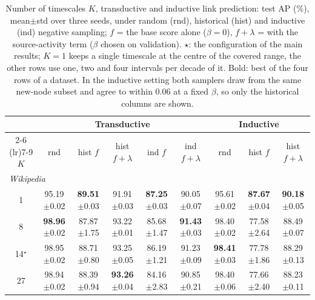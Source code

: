 \begin{table}[p]
\caption{Number of timescales $K$, transductive and inductive link prediction: test AP (\%), mean{\scriptsize$\pm$std} over three seeds, under random (rnd), historical (hist) and inductive (ind) negative sampling; $f$ = the base score alone ($\beta=0$), $f{+}\lambda$ = with the source-activity term ($\beta$ chosen on validation). $\star$: the configuration of the main results; $K=1$ keeps a single timescale at the centre of the covered range, the other rows use one, two and four intervals per decade of it. Bold: best of the four rows of a dataset. In the inductive setting both samplers draw from the same new-node subset and agree to within 0.06 at a fixed $\beta$, so only the historical columns are shown.}
\label{tab:a1_scales_full}
\centering
\footnotesize
\setlength{\tabcolsep}{2.5pt}
\renewcommand{\arraystretch}{0.92}
\begin{tabular}{ccccccccc}
\toprule
 & \multicolumn{5}{c}{Transductive} & \multicolumn{3}{c}{Inductive} \\
\cmidrule(lr){2-6} \cmidrule(lr){7-9}
$K$ & rnd & hist $f$ & hist $f{+}\lambda$ & ind $f$ & ind $f{+}\lambda$ & rnd & hist $f$ & hist $f{+}\lambda$ \\
\midrule
\multicolumn{9}{l}{\textit{Wikipedia}} \\
1 & 95.19{\scriptsize$\pm$0.02} & \textbf{89.51}{\scriptsize$\pm$0.03} & 91.91{\scriptsize$\pm$0.03} & \textbf{87.25}{\scriptsize$\pm$0.03} & 90.05{\scriptsize$\pm$0.07} & 95.61{\scriptsize$\pm$0.02} & \textbf{87.67}{\scriptsize$\pm$0.04} & \textbf{90.18}{\scriptsize$\pm$0.05} \\
8 & \textbf{98.96}{\scriptsize$\pm$0.02} & 87.87{\scriptsize$\pm$1.75} & 93.22{\scriptsize$\pm$0.01} & 85.68{\scriptsize$\pm$1.47} & \textbf{91.43}{\scriptsize$\pm$0.03} & 98.40{\scriptsize$\pm$0.02} & 77.58{\scriptsize$\pm$2.64} & 88.49{\scriptsize$\pm$0.07} \\
14$^\star$ & 98.95{\scriptsize$\pm$0.02} & 88.71{\scriptsize$\pm$0.80} & 93.25{\scriptsize$\pm$0.05} & 86.19{\scriptsize$\pm$1.21} & 91.23{\scriptsize$\pm$0.09} & \textbf{98.41}{\scriptsize$\pm$0.03} & 77.78{\scriptsize$\pm$1.86} & 88.29{\scriptsize$\pm$0.13} \\
27 & 98.94{\scriptsize$\pm$0.02} & 88.39{\scriptsize$\pm$0.94} & \textbf{93.26}{\scriptsize$\pm$0.04} & 84.16{\scriptsize$\pm$2.83} & 90.85{\scriptsize$\pm$0.21} & 98.40{\scriptsize$\pm$0.06} & 77.66{\scriptsize$\pm$2.40} & 88.23{\scriptsize$\pm$0.11} \\

\end{tabular}
\end{table}
